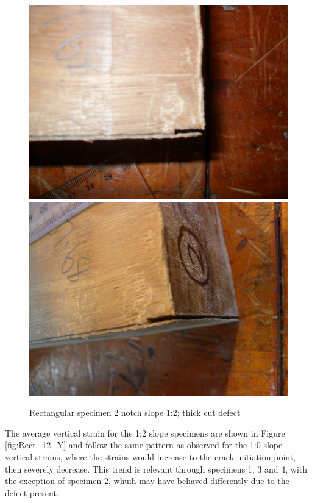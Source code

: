 \documentclass[11pt,a4paper]{article}
\numberwithin{equation}{subsection}
\begin{document}
\begin{figure}[h]
	\begin{center}
		\includegraphics[scale=0.065]{Cut_Top}
		\includegraphics[scale=0.065]{Cut_Side}
	\end{center}
	\caption{Rectangular specimen 2 notch slope 1:2; thick cut defect}
	\label{fig:Rect_Cut}
\end{figure}
\pagebreak

\noindent
The average vertical strain for the 1:2 slope specimens are shown in Figure \ref{fig:Rect_12_Y} and follow the same pattern as observed for the 1:0 slope vertical strains, where the strains would increase to the crack initiation point, then severely decrease. This trend is relevant through specimens 1, 3 and 4, with the exception of specimen 2, whuih may have behaved differently due to the defect present.
\vspace*{\baselineskip}
\end{document}
